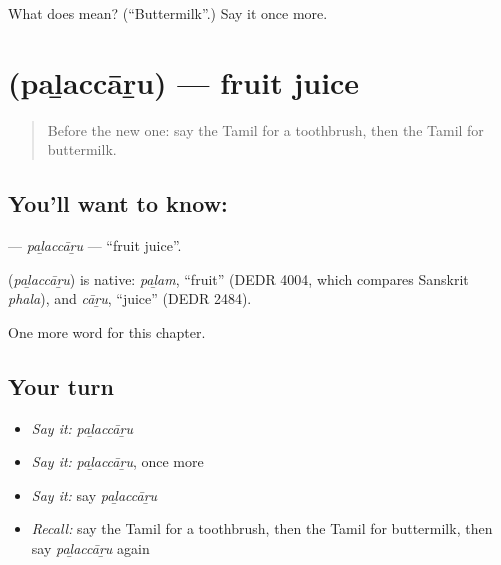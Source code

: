 \begin{tcolorbox}[breakable,colback=teal!4,colframe=teal!35!black,title={Before you move on}]
What does  mean? (\textquotedblleft{}Buttermilk\textquotedblright{}.) Say it once more.
\end{tcolorbox}
\section[\texorpdfstring{\ta{பழச்சாறு} (paḻaccāṟu)}{பழச்சாறு (paḻaccāṟu)}]{ (paḻaccāṟu) — fruit juice}

\label{lesson:TA-C214-palaccaru}



\begin{quote}
Before the new one: say the Tamil for a toothbrush, then the Tamil for buttermilk.
\end{quote}

\subsection*{You'll want to know: }
\textbf{} — \emph{paḻaccāṟu} — \textquotedblleft{}fruit juice\textquotedblright{}.

\begin{cousinweb}
\textbf{} (\emph{paḻaccāṟu}) is native: \emph{paḻam}, \textquotedblleft{}fruit\textquotedblright{} (DEDR 4004, which compares Sanskrit \emph{phala}), and \emph{cāṟu}, \textquotedblleft{}juice\textquotedblright{} (DEDR 2484).
\end{cousinweb}

\begin{grammarlens}[title={What you've built}]
One more word for this chapter.
\end{grammarlens}

\subsection*{Your turn}
\begin{itemize}
\raggedright
  \item \emph{Say it:} \emph{paḻaccāṟu}
  \item \emph{Say it:} \emph{paḻaccāṟu}, once more
  \item \emph{Say it:} say \emph{paḻaccāṟu}
  \item \emph{Recall:} say the Tamil for a toothbrush, then the Tamil for buttermilk, then say \emph{paḻaccāṟu} again
\end{itemize}

